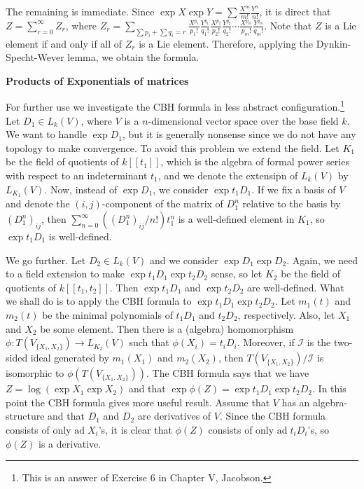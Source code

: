\documentclass{article}
\newcommand{\ad}[1]{\mathrm{ad}\; #1}
\begin{document}
The remaining is immediate.
Since $\exp{X} \exp{Y} = \sum \frac{X^m}{m!} \frac{Y^n}{n!}$, it is direct that $Z = \sum_{r = 0}^\infty Z_r$, where $Z_r = \sum_{\sum p_i + \sum q_i = r} \frac{X^{p_1}}{p_1!} \frac{Y^{q_1}}{q_1!} \frac{X^{p_2}}{p_2!} \frac{Y^{q_2}}{q_2!} \cdots \frac{X^{p_m}}{p_m!} \frac{Y^{q_m}}{q_m!}$.
Note that $Z$ is a Lie element if and only if all of $Z_r$ is a Lie element.
Therefore, applying the Dynkin-Specht-Wever lemma, we obtain the formula.

\newpage

\textbf{Products of Exponentials of matrices}

For further use we investigate the CBH formula in less abstract configuration.\footnote{This is an answer of Exercise 6 in Chapter V, Jacobson.}
Let $D_1 \in L_k(V)$, where $V$ is a $n$-dimensional vector space over the base field $k$.
We want to handle $\exp{D_1}$, but it is generally nonsense since we do not have any topology to make convergence.
To avoid this problem we extend the field.
Let $K_1$ be the field of quotients of $k[[t_1]]$, which is the algebra of formal power series with respect to an indeterminant $t_1$, and we denote the extensipn of $L_k(V)$ by $L_{K_1}(V)$.
Now, instead of $\exp{D_1}$, we consider $\exp{t_1 D_1}$.
If we fix a basis of $V$ and denote the $(i, j)$-component of the matrix of $D_1^n$ relative to the basis by $(D_1^n)_{ij}$, then $\sum_{n = 0}^\infty ((D_1^n)_{ij}/n!) t_1^n$ is a well-defined element in $K_1$, so $\exp{t_1 D_1}$ is well-defined.

We go further.
Let $D_2 \in L_k(V)$ and we consider $\exp{D_1} \exp{D_2}$.
Again, we need to a field extension to make $\exp{t_1 D_1} \exp{t_2 D_2}$ sense, so let $K_2$ be the field of quotients of $k[[t_1, t_2]]$.
Then $\exp{t_1 D_1}$ and $\exp{t_2 D_2}$ are well-defined.
What we shall do is to apply the CBH formula to $\exp{t_1 D_1} \exp{t_2 D_2}$.
Let $m_1(t)$ and $m_2(t)$ be the minimal polynomials of $t_1 D_1$ and $t_2 D_2$, respectively.
Also, let $X_1$ and $X_2$ be some element.
Then there is a (algebra) homomorphism $\phi : T(V_{\{X_1, X_2\}}) \to L_{K_2}(V)$ such that $\phi(X_i) = t_i D_i$.
Moreover, if $\mathcal{I}$ is the two-sided ideal generated by $m_1(X_1)$ and $m_2(X_2)$, then $T(V_{\{X_1, X_2\}})/\mathcal{I}$ is isomorphic to $\phi(T(V_{\{X_1, X_2\}}))$.
The CBH formula says that we have $Z = \log{(\exp{X_1} \exp{X_2})}$ and that $\exp{\phi(Z)} = \exp{t_1 D_1} \exp{t_2 D_2}$.
In this point the CBH formula gives more useful result.
Assume that $V$ has an algebra-structure and that $D_1$ and $D_2$ are derivatives of $V$.
Since the CBH formula consists of only $\ad{X_i}$'s, it is clear that $\phi(Z)$ consists of only $\ad{t_i D_i}$'s, so $\phi(Z)$ is a derivative.
\end{document}
